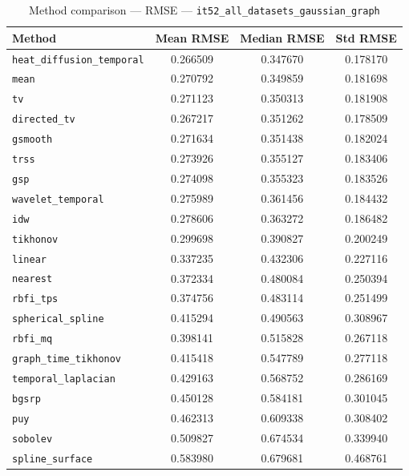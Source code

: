 \begin{table}[ht]
\centering
\caption{Method comparison — RMSE — \texttt{it52_all_datasets_gaussian_graph}}
\label{tab:rmse_it52_all_datasets_gaussian_graph}
\begin{tabular}{lccc}
\hline
Method & Mean RMSE & Median RMSE & Std RMSE \\
\hline
\texttt{heat_diffusion_temporal} & 0.266509 & 0.347670 & 0.178170 \\
\texttt{mean} & 0.270792 & 0.349859 & 0.181698 \\
\texttt{tv} & 0.271123 & 0.350313 & 0.181908 \\
\texttt{directed_tv} & 0.267217 & 0.351262 & 0.178509 \\
\texttt{gsmooth} & 0.271634 & 0.351438 & 0.182024 \\
\texttt{trss} & 0.273926 & 0.355127 & 0.183406 \\
\texttt{gsp} & 0.274098 & 0.355323 & 0.183526 \\
\texttt{wavelet_temporal} & 0.275989 & 0.361456 & 0.184432 \\
\texttt{idw} & 0.278606 & 0.363272 & 0.186482 \\
\texttt{tikhonov} & 0.299698 & 0.390827 & 0.200249 \\
\texttt{linear} & 0.337235 & 0.432306 & 0.227116 \\
\texttt{nearest} & 0.372334 & 0.480084 & 0.250394 \\
\texttt{rbfi_tps} & 0.374756 & 0.483114 & 0.251499 \\
\texttt{spherical_spline} & 0.415294 & 0.490563 & 0.308967 \\
\texttt{rbfi_mq} & 0.398141 & 0.515828 & 0.267118 \\
\texttt{graph_time_tikhonov} & 0.415418 & 0.547789 & 0.277118 \\
\texttt{temporal_laplacian} & 0.429163 & 0.568752 & 0.286169 \\
\texttt{bgsrp} & 0.450128 & 0.584181 & 0.301045 \\
\texttt{puy} & 0.462313 & 0.609338 & 0.308402 \\
\texttt{sobolev} & 0.509827 & 0.674534 & 0.339940 \\
\texttt{spline_surface} & 0.583980 & 0.679681 & 0.468761 \\
\hline
\end{tabular}
\end{table}
